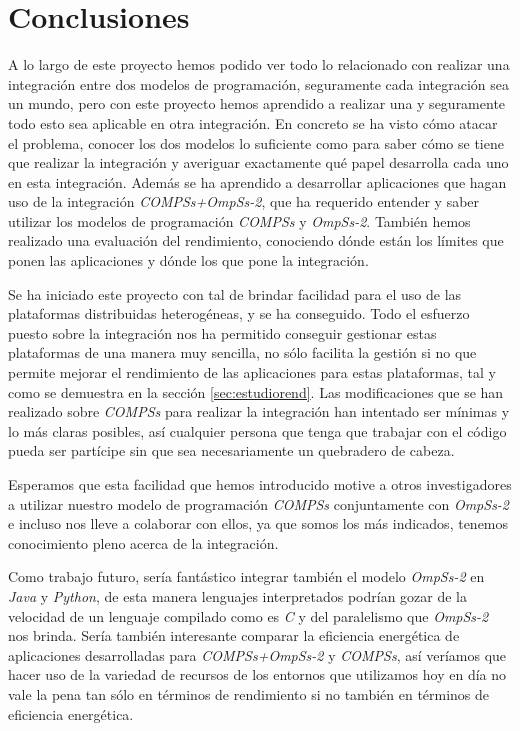 \chapter{Conclusiones}

A lo largo de este proyecto hemos podido ver todo lo relacionado con realizar una integración entre dos modelos de programación, seguramente cada integración sea un mundo, pero con este proyecto hemos aprendido a realizar una y seguramente todo esto sea aplicable en otra integración. En concreto se ha visto cómo atacar el problema, conocer los dos modelos lo suficiente como para saber cómo se tiene que realizar la integración y averiguar exactamente qué papel desarrolla cada uno en esta integración. Además se ha aprendido a desarrollar aplicaciones que hagan uso de la integración \textit{COMPSs+OmpSs-2}, que ha requerido entender y saber utilizar los modelos de programación \textit{COMPSs} y \textit{OmpSs-2}. También hemos realizado una evaluación del rendimiento, conociendo dónde están los límites que ponen las aplicaciones y dónde los que pone la integración. 

\par\bigskip

Se ha iniciado este proyecto con tal de brindar facilidad para el uso de las plataformas distribuidas heterogéneas, y se ha conseguido. Todo el esfuerzo puesto sobre la integración nos ha permitido conseguir gestionar estas plataformas de una manera muy sencilla, no sólo facilita la gestión si no que permite mejorar el rendimiento de las aplicaciones para estas plataformas, tal y como se demuestra en la sección \ref{sec:estudiorend}. Las modificaciones que se han realizado sobre \textit{COMPSs} para realizar la integración han intentado ser mínimas y lo más claras posibles, así cualquier persona que tenga que trabajar con el código pueda ser partícipe sin que sea necesariamente un quebradero de cabeza.

\par\bigskip

Esperamos que esta facilidad que hemos introducido motive a otros investigadores a utilizar nuestro modelo de programación \textit{COMPSs} conjuntamente con \textit{OmpSs-2} e incluso nos lleve a colaborar con ellos, ya que somos los más indicados, tenemos conocimiento pleno acerca de la integración.

\par\bigskip

Como trabajo futuro, sería fantástico integrar también el modelo \textit{OmpSs-2} en \textit{Java} y \textit{Python}, de esta manera lenguajes interpretados podrían gozar de la velocidad de un lenguaje compilado como es \textit{C} y del paralelismo que \textit{OmpSs-2} nos brinda. Sería también interesante comparar la eficiencia energética de aplicaciones desarrolladas para \textit{COMPSs+OmpSs-2} y \textit{COMPSs}, así veríamos que hacer uso de la variedad de recursos de los entornos que utilizamos hoy en día no vale la pena tan sólo en términos de rendimiento si no también en términos de eficiencia energética.
 

